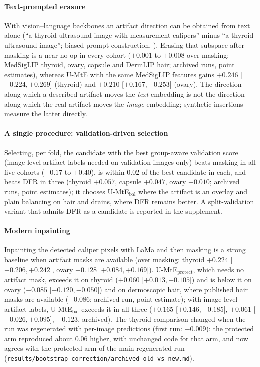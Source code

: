 \paragraph{Text-prompted erasure}
With vision--language backbones an artifact direction can be obtained from text alone (``a thyroid ultrasound image
with measurement calipers'' minus ``a thyroid ultrasound image''; biased-prompt construction, \citealp{chuang2023debiasing}).
Erasing that subspace after masking is a near no-op in every cohort ($+0.001$ to $+0.008$ over masking; MedSigLIP
thyroid, ovary, capsule and DermLIP hair; archived runs, point estimates), whereas U-MtE with the same MedSigLIP features gains $+0.246$
[$+0.224, +0.269$] (thyroid) and $+0.210$ [$+0.167, +0.253$] (ovary). The direction along which a described artifact
moves the \emph{text} embedding is not the direction along which the real artifact moves the \emph{image} embedding;
synthetic insertions measure the latter directly.

\paragraph{A single procedure: validation-driven selection}
Selecting, per fold, the candidate with the best group-aware validation score (image-level artifact labels needed on
validation images only) beats masking in all five cohorts ($+0.17$ to $+0.40$), is within 0.02 of the best
candidate in each, and beats DFR in three (thyroid $+0.057$, capsule $+0.047$, ovary $+0.010$; archived runs, point
estimates); it chooses
U-MtE$_{\text{bal}}$ where the artifact is an overlay and plain balancing on hair and drains, where DFR remains
better. A split-validation variant that admits DFR as a candidate is reported in the supplement.

\paragraph{Modern inpainting}
Inpainting the detected caliper pixels with LaMa \citep{suvorov2022lama} and then masking is a strong baseline when
artifact masks are available (over masking: thyroid $+0.224$ [$+0.206, +0.242$], ovary $+0.128$ [$+0.084, +0.169$]).
U-MtE$_{\text{protect}}$, which needs no artifact mask, exceeds it on thyroid ($+0.060$ [$+0.013, +0.105$]) and is
below it on ovary ($-0.085$ [$-0.120, -0.050$]) and on dermoscopic hair, where published hair masks are available
($-0.086$; archived run, point estimate); with image-level artifact labels, U-MtE$_{\text{bal}}$ exceeds it in all
three ($+0.165$ [$+0.146, +0.185$], $+0.061$ [$+0.026, +0.095$], $+0.123$, archived). The thyroid comparison changed when the
run was regenerated with per-image predictions (first run: $-0.009$): the protected arm reproduced about 0.06 higher,
with unchanged code for that arm, and now agrees with the protected arm of the main regenerated run
(\texttt{results/bootstrap\_correction/archived\_old\_vs\_new.md}).


